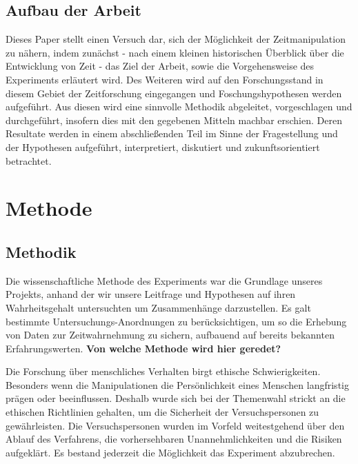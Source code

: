 \documentclass{Paper}
\begin{document}
\subsection{Aufbau der Arbeit}
Dieses Paper stellt einen Versuch dar, sich der Möglichkeit der Zeitmanipulation zu nähern, indem zunächst - nach einem kleinen historischen Überblick über die Entwicklung von Zeit - das Ziel der Arbeit, sowie die Vorgehensweise des Experiments erläutert wird. Des Weiteren wird auf den Forschungsstand in diesem Gebiet der Zeitforschung eingegangen und Foschungshypothesen werden aufgeführt. Aus diesen wird eine sinnvolle Methodik abgeleitet, vorgeschlagen und durchgeführt, insofern dies mit den gegebenen Mitteln machbar erschien. Deren Resultate werden in einem abschließenden Teil im Sinne der Fragestellung und der Hypothesen aufgeführt, interpretiert, diskutiert und zukunftsorientiert betrachtet.


\section{Methode}
        \subsection{Methodik}
Die wissenschaftliche Methode des Experiments war die Grundlage unseres Projekts, anhand der wir unsere Leitfrage und Hypothesen auf ihren Wahrheitsgehalt untersuchten um Zusammenhänge darzustellen.
Es galt bestimmte Untersuchungs-Anordnungen zu berücksichtigen, um so die Erhebung von Daten zur Zeitwahrnehmung zu sichern, aufbauend auf bereits bekannten Erfahrungswerten. \textbf{Von welche Methode wird hier geredet?}
               
Die Forschung über menschliches Verhalten birgt ethische Schwierigkeiten. Besonders wenn die Manipulationen die Persönlichkeit eines Menschen langfristig prägen oder beeinflussen. Deshalb wurde sich bei der Themenwahl strickt an die ethischen Richtlinien gehalten, um die Sicherheit der Versuchspersonen zu gewährleisten. 
Die Versuchspersonen wurden im Vorfeld weitestgehend über den Ablauf des Verfahrens, die vorhersehbaren Unannehmlichkeiten und die Risiken aufgeklärt. Es bestand jederzeit die Möglichkeit das Experiment abzubrechen.

\end{document}

